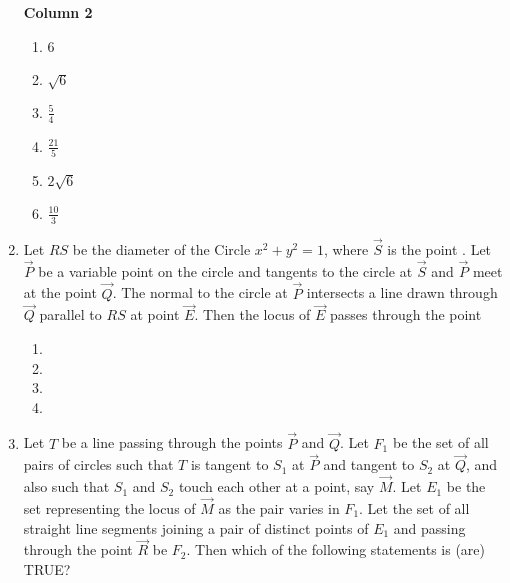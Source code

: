 \begin{enumerate}
\begin{multicols}{2}
\columnbreak
 \textbf{Column 2}
 \begin{multicols}{2}
\begin{multicols}{2}
\begin{enumerate}[label=(\alph*),  start=16]
 \item 6
 \item $\sqrt{6}$
 \item $\frac{5}{4}$                           
 \item $\frac{21}{5}$                          
 \item $2\sqrt{6}$                             
 \item $\frac{10}{3}$                         
 \end{enumerate}
\end{multicols}
\end{multicols}
\end{multicols}
%
\item Let $RS$ be the diameter of the Circle $x^{2} + y^{2} = 1$,  where $\vec{S}$ is the point . Let $\vec{P}$ be a variable point  on the circle and tangents to the circle at $\vec{S}$ and $\vec{P}$ meet at the point $\vec{Q}$. The normal to the circle at $\vec{P}$ intersects a line drawn through $\vec{Q}$ parallel to $RS$ at point $\vec{E}$. Then the locus of $\vec{E}$ passes through the point
%
\hfill {}
\begin{multicols}{4}
\begin{multicols}{2}
\begin{enumerate}
	\item {}
	\item {}
	\item {}
	\item {}
\end{enumerate}
\end{multicols}
\end{multicols}
\item Let $T$ be a line passing through the points $\vec{P}$ and $\vec{Q}$. Let $F_1$ be the set of all pairs of circles  such that $T$ is tangent to $S_1$ at $\vec{P}$ and tangent to $S_2$ at $\vec{Q}$,  and also such that $S_1$ and $S_2$ touch each other at a point,  say $\vec{M}$. Let $E_1$ be the set representing the locus of $\vec{M}$ as the pair  varies in $F_1$. Let the set of all straight line segments joining a pair of distinct points of $E_1$ and passing through the point $\vec{R}$ be $F_2$. Then which of the following statements is (are) TRUE?

\end{enumerate}
